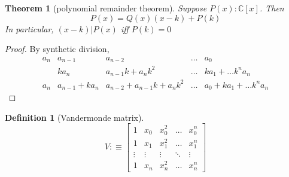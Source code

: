 \documentclass[10pt]{article}
\newcounter{thms}
\theoremstyle{definition}
\newtheorem{defn}[thms]{Definition}
\theoremstyle{definition}
\theoremstyle{plain}
\newtheorem{theorem}[thms]{Theorem}
\newcommand{\C}{\mathbb{C}}
\newcommand{\define}{:\equiv}
\begin{document}
\begin{theorem}[polynomial remainder theorem]
  Suppose $P(x):\C[x]$. Then 
  \[
  P(x)=Q(x)(x-k)+P(k)
  \]
  In particular, $(x-k)|P(x)$ iff $P(k)=0$
\end{theorem}
\begin{proof}
  By synthetic division, 
  \[
  \begin{array}{llllll}
    a_n & a_{n-1} & a_{n-2}             & \dots & a_0 \\
         & ka_n   &  a_{n-1}k+a_nk^2    &\dots & ka_1+\dots k^na_n\\
    \hline
     a_n & a_{n-1}+ka_n & a_{n-2}+ a_{n-1}k+a_nk^2& \dots & a_0+ka_1+\dots k^na_n
  \end{array}
  \]
\end{proof}


\begin{defn}[Vandermonde matrix]
  \[
  V\define
  \begin{bmatrix}
    1 & x_0 & x_0^2&\dots&x_0^n \\
    1 & x_1 & x_1^2&\dots&x_1^n \\
    \vdots &\vdots & \vdots &\ddots&\vdots \\
    1 & x_n & x_n^2&\dots&x_n^n 
  \end{bmatrix}
  \]
  \cite{wiki:vandermonde}
\end{defn}
\end{document}
